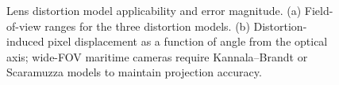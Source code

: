 \begin{figure}[t]

  \caption{Lens distortion model applicability and error magnitude. (a) Field-of-view ranges
    for the three distortion models. (b) Distortion-induced pixel displacement as a function
    of angle from the optical axis; wide-FOV maritime cameras require Kannala--Brandt or
    Scaramuzza models to maintain projection accuracy.}
  \label{fig:distortion_models}
\end{figure}
